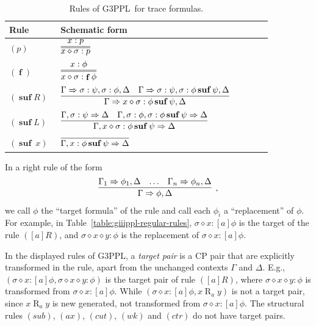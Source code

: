 \documentclass[manuscript,screen]{acmart}
\newcommand{\Sub}[0]{{\textit{sub}}}
\newcommand{\cat}[0]{\diamond}
\newcommand{\GiiiPPL}[0]{\mbox{G3PPL}}
\DeclareMathOperator{\ofst}{\mathbf{f}}
\DeclareMathOperator{\osuf}{\mathbf{suf}}
\DeclareMathOperator{\R}{R}
\begin{document}
\begin{table}[t]
\centering
\small
\begin{tabular}{p{0.18\linewidth}p{0.74\linewidth}}
\toprule
Rule & Schematic form \\
\midrule
$(p)$ & $\begin{aligned}\infer=[]{x\cat\sigma:p}{x:p}\end{aligned}$\\[1.2em]
$(\ofst)$ & $\begin{aligned}\infer=[]{x\cat\sigma:\ofst\phi}{x:\phi}\end{aligned}$\\[1.2em]
$(\osuf R)$ & $\begin{aligned}\infer[]{\Gamma\Rightarrow x\cat\sigma:\phi\osuf\psi, \Delta}{\Gamma\Rightarrow \sigma:\psi, \sigma : \phi, \Delta & \Gamma\Rightarrow \sigma : \psi, \sigma : \phi\osuf \psi, \Delta}\end{aligned}$\\[1.2em]
$(\osuf L)$ & $\begin{aligned}\infer[]{\Gamma, x\cat\sigma:\phi\osuf\psi\Rightarrow \Delta}{\Gamma, \sigma:\psi\Rightarrow \Delta & \Gamma, \sigma : \phi, \sigma : \phi\osuf\psi\Rightarrow \Delta}\end{aligned}$\\[1.2em]
$(\osuf\ x)$ & $\begin{aligned}\infer[]{\Gamma,x:\phi\osuf\psi\Rightarrow\Delta}{}\end{aligned}$\\
\bottomrule
\end{tabular}
\caption{Rules of \GiiiPPL\ for trace formulas.}
\label{table:giiippl-trace-rules}
\end{table}

In a right rule of the form
$$
\begin{aligned}
\infer[]
{\Gamma\Rightarrow \phi, \Delta}
{\Gamma_1\Rightarrow \phi_1, \Delta & \ldots & \Gamma_n\Rightarrow \phi_n, \Delta}
\end{aligned}, 
$$
we call $\phi$ the ``target formula'' of the rule and call each $\phi_i$ a ``replacement'' of $\phi$.
For example, in Table~\ref{table:giiippl-regular-rules}, $\sigma\cat x : [a]\phi$ is the target of the rule $([a]R)$, and $\sigma\cat x\cat y:\phi$ is the replacement of $\sigma\cat x : [a]\phi$. 

\ifx
In the displayed rules of \GiiiPPL, 
a \emph{target pair} is a CP pair that are explicitly transformed in the rule, apart from the unchanged contexts $\Gamma$ and $\Delta$. 
E.g., $(\sigma\cat x : [a]\phi, \sigma\cat x\cat y:\phi)$ is the target pair of rule $([a]R)$, where $\sigma\cat x\cat y:\phi$ is transformed from $\sigma\cat x : [a]\phi$. 
While $(\sigma\cat x : [a]\phi, x\R_a y)$ is not a target pair, since $x\R_a y$ is new generated, not transformed from $\sigma\cat x : [a]\phi$. 
The structural rules $(\Sub)$, $(ax)$, $(cut)$, $(wk)$ and $(ctr)$ do not have target pairs.
\fi
\end{document}
